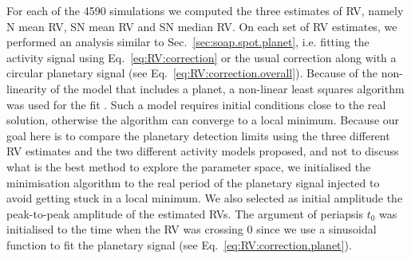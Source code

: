 \documentclass{aa}
\begin{document}
For each of the 4590 simulations we computed the three estimates of RV, namely N mean RV, SN mean RV and SN median RV. 
On each set of RV estimates, we performed an analysis similar to Sec.~\ref{sec:soap.spot.planet}, i.e. fitting the activity signal using Eq.~\eqref{eq:RV:correction}
or the usual correction along with a circular planetary signal (see Eq.~\eqref{eq:RV:correction.overall}). Because of the non-linearity of the model that includes a 
planet, a non-linear least squares algorithm was used for the fit \citep[][]{levenberg1944method,marquardt1963algorithm,teunissen1990nonlinear}. Such a model requires
initial conditions close to the real solution, otherwise the algorithm can converge to a local minimum. Because our goal here is to compare the planetary detection limits
using the three different RV estimates and the two different activity models proposed, and not to discuss what is the best method to explore the parameter space, we 
initialised the minimisation algorithm to the real period of the planetary signal injected to avoid getting stuck in a local minimum. We also selected as initial amplitude the peak-to-peak amplitude of the estimated RVs.
The argument of periapsis $t_0$ was initialised to the time when the RV was crossing 0 since we use a sinusoidal function to fit the planetary signal (see Eq.~\eqref{eq:RV:correction.planet}).
\end{document}
